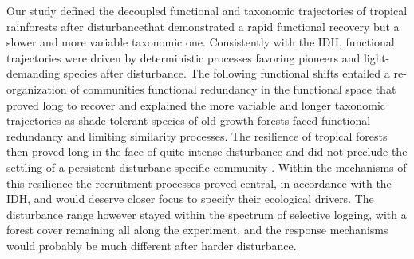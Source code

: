 \documentclass[fleqn,10pt]{ArtEcoFoG} %
\theoremstyle{definition}
\theoremstyle{definition}
\theoremstyle{definition}
\theoremstyle{remark}
\begin{document}
Our study defined the decoupled functional and taxonomic trajectories of
tropical rainforests after disturbancethat demonstrated a rapid
functional recovery but a slower and more variable taxonomic one.
Consistently with the IDH, functional trajectories were driven by
deterministic processes favoring pioneers and light-demanding species
after disturbance. The following functional shifts entailed a
re-organization of communities functional redundancy in the functional
space that proved long to recover and explained the more variable and
longer taxonomic trajectories as shade tolerant species of old-growth
forests faced functional redundancy and limiting similarity processes.
The resilience of tropical forests then proved long in the face of quite
intense disturbance and did not preclude the settling of a persistent
disturbanc-specific community \citep{Gourlet-Fleury2005}. Within the
mechanisms of this resilience the recruitment processes proved central,
in accordance with the IDH, and would deserve closer focus to specify
their ecological drivers. The disturbance range however stayed within
the spectrum of selective logging, with a forest cover remaining all
along the experiment, and the response mechanisms would probably be much
different after harder disturbance.



\makeatletter

\makeatother


\end{document}
